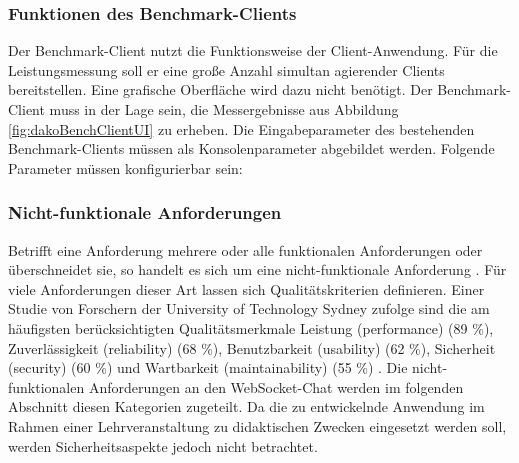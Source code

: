 \documentclass[11pt,a4paper,titlepage]{scrartcl}
\numberwithin{equation}{section}
\begin{document}
\subsubsection*{Funktionen des Benchmark-Clients}
Der Benchmark-Client nutzt die Funktionsweise der Client-Anwendung. Für die Leistungsmessung soll er eine große Anzahl simultan agierender Clients bereitstellen. Eine grafische Oberfläche wird dazu nicht benötigt. Der Benchmark-Client muss in der Lage sein, die Messergebnisse aus Abbildung \ref{fig:dakoBenchClientUI} zu erheben. Die Eingabeparameter des bestehenden Benchmark-Clients müssen als Konsolenparameter abgebildet werden. Folgende Parameter müssen konfigurierbar sein:
\begin{itemize}
\end{itemize}


\subsubsection{Nicht-funktionale Anforderungen}
Betrifft eine Anforderung mehrere oder alle funktionalen Anforderungen oder überschneidet sie, so handelt es sich um eine nicht-funktionale Anforderung \autocite[109]{balzert_lehrbuch_2011}. Für viele Anforderungen dieser Art lassen sich Qualitätskriterien definieren. Einer Studie von Forschern der University of Technology Sydney zufolge sind die am häufigsten berücksichtigten Qualitätsmerkmale Leistung (performance) (89 \%), Zuverlässigkeit (reliability) (68 \%), Benutzbarkeit (usability) (62 \%), Sicherheit (security) (60 \%) und Wartbarkeit (maintainability) (55 \%) \autocite[314]{mairiza_investigation_2010}. Die nicht-funktionalen Anforderungen an den WebSocket-Chat werden im folgenden Abschnitt diesen Kategorien zugeteilt. Da die zu entwickelnde Anwendung im Rahmen einer Lehrveranstaltung zu didaktischen Zwecken eingesetzt werden soll, werden Sicherheitsaspekte jedoch nicht betrachtet.
\end{document}

